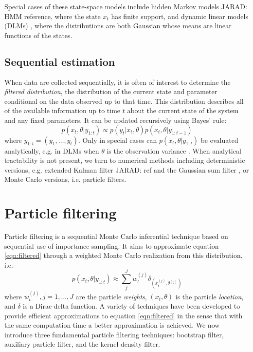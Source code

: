\documentclass{article}
\newcommand{\jarad}[1]{{\color{red}JARAD: #1}}
\begin{document}
Special cases of these state-space models include hidden Markov models \jarad{HMM reference}, where the state $x_t$ has finite support, and dynamic linear models (DLMs) \citep{West:Harr:baye:1997}, where the distributions are both Gaussian whose means are linear functions of the states.

\subsection{Sequential estimation}

When data are collected sequentially, it is often of interest to determine the \emph{filtered distribution}, the distribution of the current state and parameter conditional on the data observed up to that time. This distribution describes all of the available information up to time $t$ about the current state of the system and any fixed parameters. It can be updated recursively using Bayes' rule:
\begin{equation}
p(x_t,\theta| y_{1:t}) \propto p(y_t|x_t,\theta)p(x_t,\theta|y_{1:t-1}) \label{eqn:filtered}
\end{equation}
where $y_{1:t} = (y_1,\ldots,y_t)$. Only in special cases can $p(x_t,\theta| y_{1:t})$ be evaluated analytically, e.g. in DLMs when $\theta$ is the observation variance \cite[Sec 4.3,][]{petris2009dynamic}. When analytical tractability is not present, we turn to numerical methods including deterministic versions, e.g. extended Kalman filter \jarad{ref} and the Gaussian sum filter \citep{Alsp:Sore:nonl:1972}, or Monte Carlo versions, i.e. particle filters.

\section{Particle filtering \label{sec:filtering}}

Particle filtering is a sequential Monte Carlo inferential technique based on sequential use of importance sampling. It aims to approximate equation \eqref{eqn:filtered} through a weighted Monte Carlo realization from this distribution, i.e.
\begin{equation}
p(x_t,\theta| y_{1:t}) \approx \sum_{j}^J w_t^{(j)} \delta_{(x_t^{(j)},\theta^{(j)})} \label{eqn:approx}
\end{equation}
where $w_t^{(j)},j=1,\ldots,J$ are the particle \emph{weights}, $(x_t,\theta)$ is the particle \emph{location}, and $\delta$ is a Dirac delta function. A variety of techniques have been developed to provide efficient approximations to equation \eqref{eqn:filtered} in the sense that with the same computation time a better approximation is achieved. We now introduce three fundamental particle filtering techniques: bootstrap filter, auxiliary particle filter, and the kernel density filter.
\end{document}
